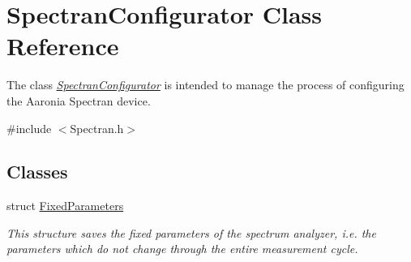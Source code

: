 \hypertarget{classSpectranConfigurator}{}\section{Spectran\+Configurator Class Reference}
\label{classSpectranConfigurator}


The class {\itshape \hyperlink{classSpectranConfigurator}{Spectran\+Configurator}} is intended to manage the process of configuring the Aaronia Spectran device.  




{\ttfamily \#include $<$Spectran.\+h$>$}

\subsection*{Classes}
\begin{DoxyCompactItemize}
\item 
struct \hyperlink{structSpectranConfigurator_1_1FixedParameters}{Fixed\+Parameters}
\begin{DoxyCompactList}\small\item\em This structure saves the fixed parameters of the spectrum analyzer, i.\+e. the parameters which do not change through the entire measurement cycle. \end{DoxyCompactList}\end{DoxyCompactItemize}
